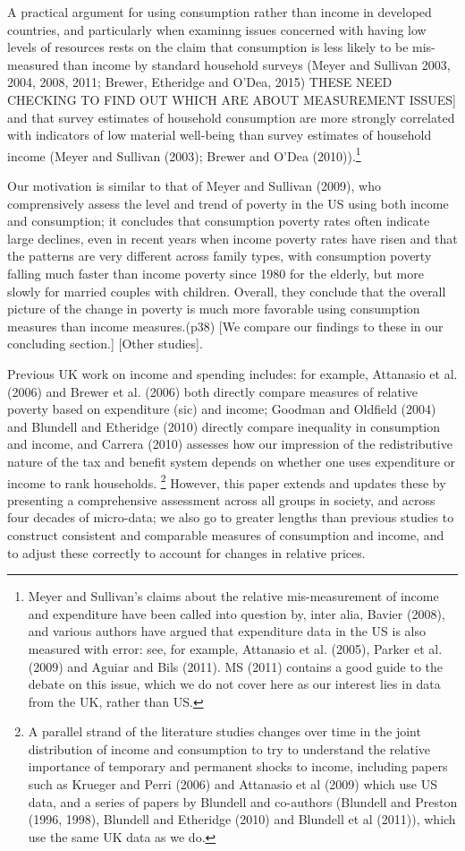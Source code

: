 A practical argument for using consumption rather than income in developed countries, and particularly when examinng issues concerned with having low levels of resources rests on the claim that consumption is less likely to be mis-measured than income by standard household surveys  (Meyer and Sullivan 2003, 2004, 2008, 2011; Brewer, Etheridge and O'Dea, 2015) THESE NEED CHECKING TO FIND OUT WHICH ARE ABOUT MEASUREMENT ISSUES] and that survey estimates of household consumption are more strongly correlated with indicators of low material well-being than survey estimates of household income (Meyer and Sullivan (2003); Brewer and O'Dea (2010)).\footnote{Meyer and Sullivan's claims about the relative mis-measurement of income and expenditure have been called into question by, inter alia, Bavier (2008), and various authors have argued that expenditure data in the US is also measured with error: see, for example, Attanasio et al. (2005), Parker et al. (2009) and Aguiar and Bils (2011). MS (2011) contains a good guide to the debate on this issue, which we do not cover here as our interest lies in data from the UK, rather than US.}



Our motivation is similar to that of Meyer and Sullivan (2009), who comprensively assess the level and trend of poverty in the US using both income and consumption; it concludes that consumption poverty rates often indicate large declines, even in recent years when income poverty rates have risen and that the patterns are very different across family types, with consumption poverty falling much faster than income poverty since 1980 for the elderly, but more slowly for married couples with children. Overall, they conclude that the overall picture of the change in poverty is much more favorable using consumption measures than income measures.(p38) [We compare our findings to these in our concluding section.]
[Other studies].

Previous UK work on income and spending includes: for example, Attanasio et al. (2006) and Brewer et al. (2006) both directly compare measures of relative poverty based on expenditure (sic) and income; Goodman and Oldfield (2004) and Blundell and Etheridge (2010) directly compare inequality in consumption and income, and Carrera (2010) assesses how our impression of the redistributive nature of the tax and benefit system depends on whether one uses expenditure or income to rank households. \footnote{A parallel strand of the literature studies changes over time in the joint distribution of income and consumption to try to understand the relative importance of temporary and permanent shocks to income, including papers such as Krueger and Perri (2006) and Attanasio et al (2009) which use US data, and a series of papers by Blundell and co-authors (Blundell and Preston (1996, 1998), Blundell and Etheridge (2010) and Blundell et al (2011)), which use the same UK data as we do.} However, this paper extends and updates these by presenting a comprehensive assessment across all groups in society, and across four decades of micro-data; we also go to greater lengths than previous studies to construct consistent and comparable measures of consumption and income, and to adjust these correctly to account for changes in relative prices.

